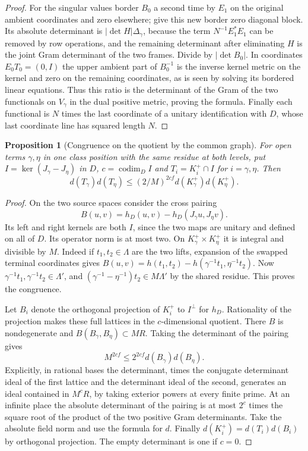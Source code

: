\documentclass[a4paper,11pt]{article}
\newtheorem{proposition}{Proposition}[section]
\theoremstyle{definition}
\theoremstyle{remark}
\numberwithin{equation}{section}
\begin{document}
\begin{proof}
For the singular values border \(B_0\) a second time by \(E_1\)
on the original ambient coordinates and zero elsewhere; give
this new border zero diagonal block. Its absolute determinant
is \(|\det H|\Delta_\gamma\), because the term
\(N^{-1}E_1^*E_1\) can be removed by row operations, and the
remaining determinant after eliminating \(H\) is the joint
Gram determinant of the two frames. Divide by \(|\det B_0|\).
In coordinates \(E_0T_0=(0,I)\) the upper ambient part of
\(B_0^{-1}\) is the inverse kernel metric on the kernel and
zero on the remaining coordinates, as is seen by solving its
bordered linear equations. Thus this ratio is the determinant
of the Gram of the two functionals on \(V_\gamma\) in the dual
positive metric, proving the formula. Finally each functional
is \(N\) times the last coordinate of a unitary identification
with \(D\), whose last coordinate line has squared length \(N\).
\end{proof}

\begin{proposition}[Congruence on the quotient by the common graph]
\leavevmode\label{prop:crosslink688}
For open terms \(\gamma,\eta\) in one class position with the
same residue at both levels, put \(I=\ker(J_\gamma-J_\eta)\)
in \(D\), \(c=\operatorname{codim}_D I\) and
\(T_i=K_i^+\cap I\) for \(i=\gamma,\eta\). Then
\[
       d(T_\gamma)d(T_\eta)
           \le (2/M)^{2cf} d(K_\gamma^+)d(K_\eta^+).
\]
\end{proposition}
\begin{proof}
On the two source spaces consider the cross pairing
\[
 B(u,v)=h_D(u,v)-h_D(J_\gamma u,J_\eta v).
\]
Its left and right kernels are both \(I\), since the two maps
are unitary and defined on all of \(D\). Its operator norm is
at most two. On \(K_\gamma^+\times K_\eta^+\) it is integral
and divisible by \(M\). Indeed if \(t_1,t_2\in\Lambda\) are
the two lifts, expansion of the swapped terminal coordinates
gives
\(B(u,v)=h(t_1,t_2)-h(\gamma^{-1}t_1,\eta^{-1}t_2)\).
Now \(\gamma^{-1}t_1,\gamma^{-1}t_2\in\Lambda'\), and
\((\gamma^{-1}-\eta^{-1})t_2\in M\Lambda'\) by the shared
residue. This proves the congruence.

Let \(B_i\) denote the orthogonal projection of \(K_i^+\) to
\(I^\perp\) for \(h_D\). Rationality of the projection makes
these full lattices in the \(c\)-dimensional quotient. There
\(B\) is nondegenerate and \(B(B_\gamma,B_\eta)\subset MR\).
Taking the determinant of the pairing gives
\[
                      M^{2cf}\le 2^{2cf}d(B_\gamma)d(B_\eta).
\]
Explicitly, in rational bases the determinant, times the
conjugate determinant ideal of the first lattice and the
determinant ideal of the second, generates an ideal contained
in \(M^cR\), by taking exterior powers at every finite prime.
At an infinite place the absolute determinant of the pairing is
at most \(2^c\) times the square root of the product of the
two positive Gram determinants. Take the absolute field norm
and use the formula for \(d\). Finally
\(d(K_i^+)=d(T_i)d(B_i)\) by orthogonal projection. The empty
determinant is one if \(c=0\).
\end{proof}
\end{document}
